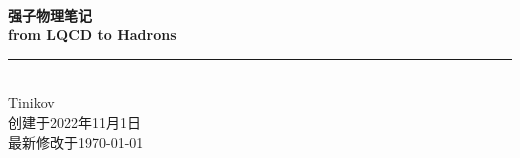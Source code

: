 \documentclass[10pt,b5paper, openany]{book} %
\newcommand{\HRule}{\rule{\linewidth}{0.5mm}}
\begin{document}
\pagestyle{fancy}

\begin{titlepage}
  \centering

  \mbox{} \\[-0.3cm]

  {\bfseries \fontsize{32pt}{1pt}\selectfont {}强子物理笔记} \\[0.4cm]

  {\bfseries \fontsize{16pt}{1pt}\selectfont from LQCD to Hadrons} \\[0.6cm]

  \HRule \\[0.8cm]

  {\Large Tinikov} \\[0.3cm]

  {\small 创建于2022年11月1日} \\[-0.1cm]

  {\small 最新修改于\today} \\[0.4cm]
\end{titlepage}

\setcounter{page}{1}

\clearpage

{}
\tableofcontents
\clearpage

\begin{spacing}{1.2}
  \setcounter{page}{1}

  \pagestyle{general}
  

  \pagestyle{general}
  


\end{spacing}
\end{document}
